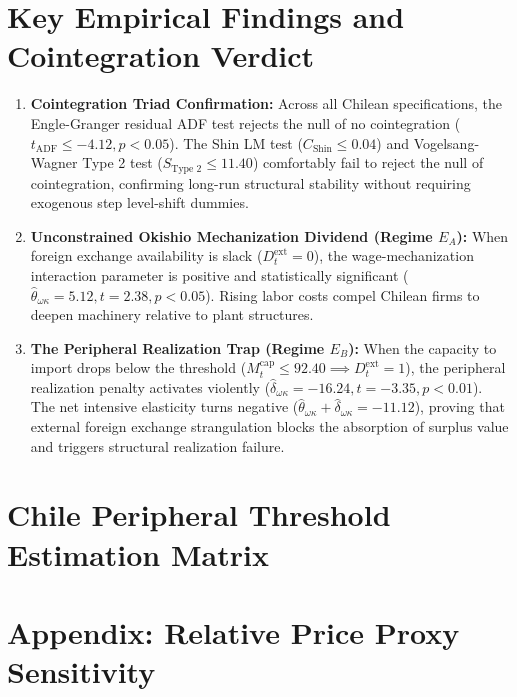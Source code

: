 \documentclass[11pt,a4paper]{article}
\begin{document}
\section*{Key Empirical Findings and Cointegration Verdict}
\begin{enumerate}
    \item \textbf{Cointegration Triad Confirmation:} Across all Chilean specifications, the Engle-Granger residual ADF test rejects the null of no cointegration ($t_{\text{ADF}} \le -4.12, p < 0.05$). The Shin LM test ($C_{\text{Shin}} \le 0.04$) and Vogelsang-Wagner Type 2 test ($S_{\text{Type 2}} \le 11.40$) comfortably fail to reject the null of cointegration, confirming long-run structural stability without requiring exogenous step level-shift dummies.
    \item \textbf{Unconstrained Okishio Mechanization Dividend (Regime $E_A$):} When foreign exchange availability is slack ($D^{\text{ext}}_t = 0$), the wage-mechanization interaction parameter is positive and statistically significant ($\hat{\theta}_{\omega\kappa} = 5.12, t = 2.38, p < 0.05$). Rising labor costs compel Chilean firms to deepen machinery relative to plant structures.
    \item \textbf{The Peripheral Realization Trap (Regime $E_B$):} When the capacity to import drops below the threshold ($M^{\text{cap}}_t \le 92.40 \implies D^{\text{ext}}_t = 1$), the peripheral realization penalty activates violently ($\hat{\delta}_{\omega\kappa} = -16.24, t = -3.35, p < 0.01$). The net intensive elasticity turns negative ($\hat{\theta}_{\omega\kappa} + \hat{\delta}_{\omega\kappa} = -11.12$), proving that external foreign exchange strangulation blocks the absorption of surplus value and triggers structural realization failure.
\end{enumerate}

\FloatBarrier
\section{Chile Peripheral Threshold Estimation Matrix}
\FloatBarrier


\FloatBarrier
\section{Appendix: Relative Price Proxy Sensitivity}
\FloatBarrier

\end{document}
